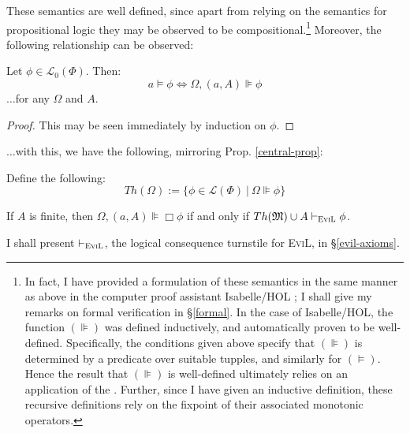 These semantics are well defined, since apart from relying on the semantics
for propositional logic they may be observed to be compositional.{\footnote{In
fact, I have provided a formulation of these semantics in the same manner as
above in the computer proof assistant Isabelle/HOL \citep{nipkow_isabelle/hol:proof_2002}; I shall
give my remarks on formal verification in \S\ref{formal}.  In the case of
Isabelle/HOL, the function $(\VDash)$ was defined inductively, and
automatically proven to be well-defined.  Specifically, the conditions given
above specify that $(\VDash)$ is determined by a 
predicate over suitable tupples, and similarly for $(\models)$.  Hence the
result that $(\VDash)$ is well-defined ultimately relies on an application of
the  \citep[chapter 12]{roman_lattices_2008}. Further,
since I have given an inductive definition, these recursive definitions rely
on the {} fixpoint of their associated monotonic operators.}} 
Moreover, the following relationship can be observed:

\begin{lemma}\label{truthiness}
  Let $\phi \in \mathcal{L}_0 (\Phi)$.  Then:
  \[ a \models \phi \Longleftrightarrow \Omega, (a, A) \VDash \phi \]
  $\ldots$for any $\Omega$ and $A$.
\end{lemma}
\begin{proof}
  This may be seen immediately by induction on $\phi$.
\end{proof}

$\ldots$with this, we have the following, mirroring Prop. \ref{central-prop}:
 
\begin{definition}  Define the following:
 $$Th(\Omega) := \{ \phi \in \mathcal{L}(\Phi) \ |\ \Omega \VDash \phi \}$$
\end{definition}

\begin{theorem}\label{theorem-theorem}
  If $A$ is finite, then $\Omega, (a,A) \VDash \Box \phi$ if and only if $Th(\Omega) \cup A \vdash_{\text{\textsc{EviL}}} \phi$.
\end{theorem}

I shall present $\vdash_{\text{\textsc{EviL}}}$, the logical consequence turnstile for \textsc{EviL}, in \S\ref{evil-axioms}.

